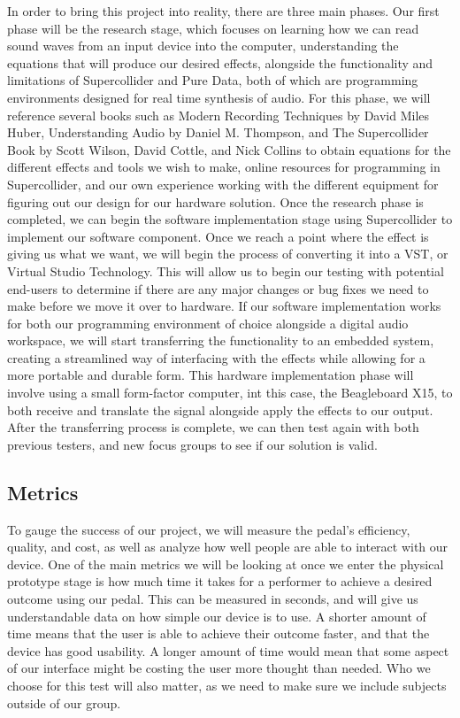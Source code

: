 \documentclass[onecolumn, draftclsnofoot,10pt, compsoc]{IEEEtran}
\begin{document}
In order to bring this project into reality, there are three main phases. Our first phase will be the research stage, which focuses on learning how we can read sound waves from an input device into the computer, understanding the equations that will produce our desired effects, alongside the functionality and limitations of Supercollider and Pure Data, both of which are programming environments designed for real time synthesis of audio. For this phase, we will reference several books such as Modern Recording Techniques by David Miles Huber, Understanding Audio by Daniel M. Thompson, and The Supercollider Book by Scott Wilson, David Cottle, and Nick Collins to obtain equations for the different effects and tools we wish to make, online resources for programming in Supercollider, and our own experience working with the different equipment for figuring out our design for our hardware solution.
Once the research phase is completed, we can begin the software implementation stage using Supercollider to implement our software component. Once we reach a point where the effect is giving us what we want, we will begin the process of converting it into a VST, or Virtual Studio Technology. This will allow us to begin our testing with potential end-users to determine if there are any major changes or bug fixes we need to make before we move it over to hardware.
If our software implementation works for both our programming environment of choice alongside a digital audio workspace, we will start transferring the functionality to an embedded system, creating a streamlined way of interfacing with the effects while allowing for a more portable and durable form. This hardware implementation phase will involve using a small form-factor computer, int this case, the Beagleboard X15, to both receive and translate the signal alongside apply the effects to our output. After the transferring process is complete, we can then test again with both previous testers, and new focus groups to see if our solution is valid.

\subsection{Metrics}
To gauge the success of our project, we will measure the pedal's efficiency, quality, and cost, as well as analyze how well people are able to interact with our device. One of the main metrics we will be looking at once we enter the physical prototype stage is how much time it takes for a performer to achieve a desired outcome using our pedal. This can be measured in seconds, and will give us understandable data on how simple our device is to use. A shorter amount of time means that the user is able to achieve their outcome faster, and that the device has good usability. A longer amount of time would mean that some aspect of our interface might be costing the user more thought than needed. Who we choose for this test will also matter, as we need to make sure we include subjects outside of our group.
\end{document}
